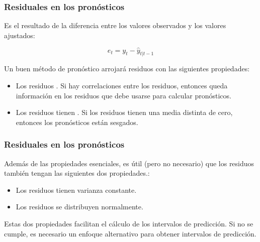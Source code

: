 \documentclass[10pt]{beamer}
\begin{document}
\begin{frame}
\frametitle{Residuales en los pronósticos}

\begin{block}{}
Es el resultado de la diferencia entre los valores observados y los valores ajustados:

\begin{equation}
e_t = y_t - \hat{y}_{t|t-1}
\end{equation}

\end{block}


\vspace{4mm}


Un buen método de pronóstico arrojará residuos con las siguientes propiedades:

\begin{itemize}

\item Los residuos . Si hay correlaciones entre los residuos, entonces queda información en los residuos que debe usarse para calcular pronósticos. 


\item Los residuos tienen . Si los residuos tienen una media distinta de cero, entonces los pronósticos están sesgados.

\end{itemize}


\end{frame}







\begin{frame}
\frametitle{Residuales en los pronósticos}

Además de las propiedades esenciales, es útil (pero no necesario) que los residuos también tengan las siguientes dos propiedades.:

\vspace{4mm}

\begin{itemize}

\item Los residuos tienen varianza constante.

\item Los residuos se distribuyen normalmente.

\end{itemize}

\vspace{4mm}

Estas dos propiedades facilitan el cálculo de los intervalos de predicción. Si no se cumple, es necesario un enfoque alternativo para obtener intervalos de predicción.

\end{frame}
\end{document}
